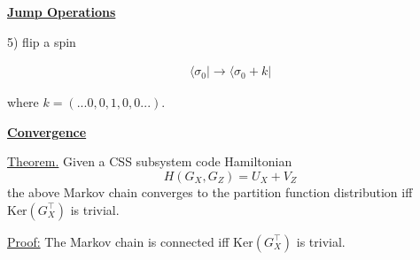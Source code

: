 \documentclass[11pt]{article}
\def\heading #1{\centerline{\underline{\bf\LARGE #1}}}
\def\vsp {\vspace*{0.5cm}}
\def\bra #1{\langle #1|}
\begin{document}
\newpage %

\heading{Jump Operations}

\vsp
5) flip a spin

\begin{align*}
    \bra{\sigma_0} \longrightarrow  \bra{\sigma_0 + k} 
\end{align*}

where $k = (...0, 0, 1, 0, 0...)$.

\newpage %

\heading{Convergence}

\vsp
\underline{Theorem.}
Given a CSS subsystem code Hamiltonian
$$H(G_X, G_Z) = U_X + V_Z$$
the above Markov chain converges to the partition
function distribution iff $\mbox{Ker}(G_X^\top)$ is trivial.

\vsp
\underline{Proof:}
The Markov chain is
connected iff $\mbox{Ker}(G_X^\top)$ is trivial.
\end{document}
